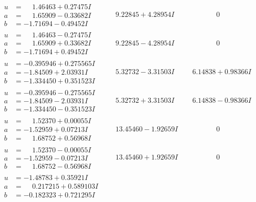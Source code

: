 \documentclass[1p]{elsarticle_modified}
\theoremstyle{definition}
\begin{document}
$$\begin{array}{c|c|c}
\begin{aligned}
u &= \phantom{-}1.46463 + 0.27475 I \\
a &= \phantom{-}1.65909 - 0.33682 I \\
b &= -1.71694 - 0.49452 I\end{aligned}
 & \phantom{-}9.22845 + 4.28954 I & \phantom{-0.000000 } 0 \\ \hline\begin{aligned}
u &= \phantom{-}1.46463 - 0.27475 I \\
a &= \phantom{-}1.65909 + 0.33682 I \\
b &= -1.71694 + 0.49452 I\end{aligned}
 & \phantom{-}9.22845 - 4.28954 I & \phantom{-0.000000 } 0 \\ \hline\begin{aligned}
u &= -0.395946 + 0.275565 I \\
a &= -1.84509 + 2.03931 I \\
b &= -1.334450 + 0.351523 I\end{aligned}
 & \phantom{-}5.32732 - 3.31503 I & \phantom{-}6.14838 + 0.98366 I \\ \hline\begin{aligned}
u &= -0.395946 - 0.275565 I \\
a &= -1.84509 - 2.03931 I \\
b &= -1.334450 - 0.351523 I\end{aligned}
 & \phantom{-}5.32732 + 3.31503 I & \phantom{-}6.14838 - 0.98366 I \\ \hline\begin{aligned}
u &= \phantom{-}1.52370 + 0.00055 I \\
a &= -1.52959 + 0.07213 I \\
b &= \phantom{-}1.68752 + 0.56968 I\end{aligned}
 & \phantom{-}13.45460 - 1.92659 I & \phantom{-0.000000 } 0 \\ \hline\begin{aligned}
u &= \phantom{-}1.52370 - 0.00055 I \\
a &= -1.52959 - 0.07213 I \\
b &= \phantom{-}1.68752 - 0.56968 I\end{aligned}
 & \phantom{-}13.45460 + 1.92659 I & \phantom{-0.000000 } 0 \\ \hline\begin{aligned}
u &= -1.48783 + 0.35921 I \\
a &= \phantom{-}0.217215 + 0.589103 I \\
b &= -0.182323 + 0.721295 I\end{aligned}

\end{array}$$
\end{document}
